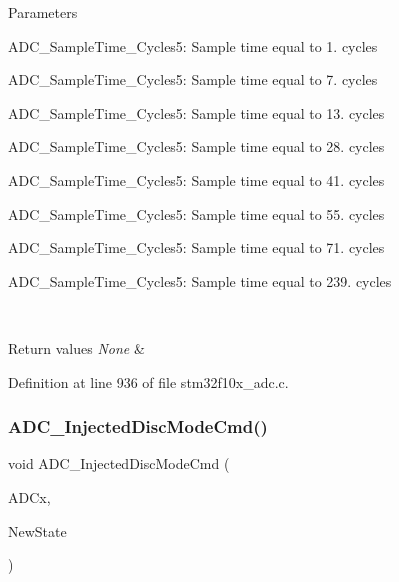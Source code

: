 \begin{DoxyParams}{Parameters}
\begin{DoxyItemize}
\item A\+D\+C\+\_\+\+Sample\+Time\+\_\+Cycles5\+: Sample time equal to 1. cycles \item A\+D\+C\+\_\+\+Sample\+Time\+\_\+Cycles5\+: Sample time equal to 7. cycles \item A\+D\+C\+\_\+\+Sample\+Time\+\_\+Cycles5\+: Sample time equal to 13. cycles \item A\+D\+C\+\_\+\+Sample\+Time\+\_\+Cycles5\+: Sample time equal to 28. cycles \item A\+D\+C\+\_\+\+Sample\+Time\+\_\+Cycles5\+: Sample time equal to 41. cycles \item A\+D\+C\+\_\+\+Sample\+Time\+\_\+Cycles5\+: Sample time equal to 55. cycles \item A\+D\+C\+\_\+\+Sample\+Time\+\_\+Cycles5\+: Sample time equal to 71. cycles \item A\+D\+C\+\_\+\+Sample\+Time\+\_\+Cycles5\+: Sample time equal to 239. cycles \end{DoxyItemize}
\\
\hline
\end{DoxyParams}

\begin{DoxyRetVals}{Return values}
{\em None} & \\
\hline
\end{DoxyRetVals}


Definition at line 936 of file stm32f10x\+\_\+adc.\+c.

\mbox{\label{group___a_d_c___exported___functions_ga0b583b94183fa4ff287177b9ee808092}} 
\subsubsection{\texorpdfstring{A\+D\+C\+\_\+\+Injected\+Disc\+Mode\+Cmd()}{ADC\_InjectedDiscModeCmd()}}
{\footnotesize\ttfamily void A\+D\+C\+\_\+\+Injected\+Disc\+Mode\+Cmd (\begin{DoxyParamCaption}\item[{\hyperlink{struct_a_d_c___type_def}{A\+D\+C\+\_\+\+Type\+Def} $\ast$}]{A\+D\+Cx,  }\item[{\hyperlink{group___exported__types_gac9a7e9a35d2513ec15c3b537aaa4fba1}{Functional\+State}}]{New\+State }\end{DoxyParamCaption})}



